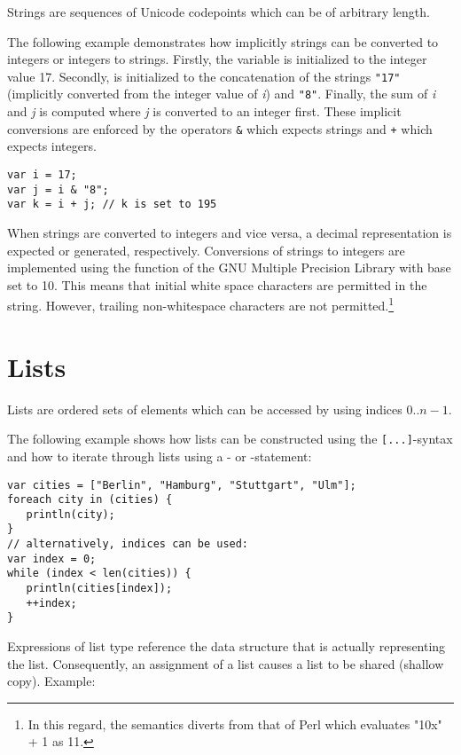 Strings are sequences of Unicode codepoints which can be of arbitrary length.

The following example demonstrates how implicitly strings can be
converted to integers or integers to strings. Firstly, the variable
 is initialized to the integer value 17. Secondly, 
is initialized to the concatenation of the strings \lstinline!"17"!
(implicitly converted from the integer value of \textit{i}) and
\lstinline!"8"!. Finally, the sum of \textit{i} and \textit{j} is
computed where \textit{j} is converted to an integer first. These
implicit conversions are enforced by the operators \lstinline!&!
which expects strings and \lstinline!+! which expects integers.

\begin{lstlisting}
var i = 17;
var j = i & "8";
var k = i + j; // k is set to 195
\end{lstlisting}

When strings are converted to integers and vice versa,
a decimal representation is expected or generated, respectively.
Conversions of strings to integers are implemented using
the  function of the
GNU Multiple Precision Library
with base set to 10. This means that initial white space characters are
permitted in the string. However, trailing non-whitespace characters
are not permitted.\footnote{In this regard, the semantics diverts from that of
Perl which evaluates "10x" + 1 as 11.}

\section{Lists}

Lists are ordered sets of elements which can be accessed by
using indices $0..n-1$.

The following example shows how lists can be constructed
using the \lstinline![...]!-syntax and how to iterate through
lists using a - or -statement:

\begin{lstlisting}
var cities = ["Berlin", "Hamburg", "Stuttgart", "Ulm"];
foreach city in (cities) {
   println(city);
}
// alternatively, indices can be used:
var index = 0;
while (index < len(cities)) {
   println(cities[index]);
   ++index;
}
\end{lstlisting}

\noindent
Expressions of list type reference the data structure that is
actually representing the list. Consequently,
an assignment of a list causes a list to be shared
(shallow copy). Example:

